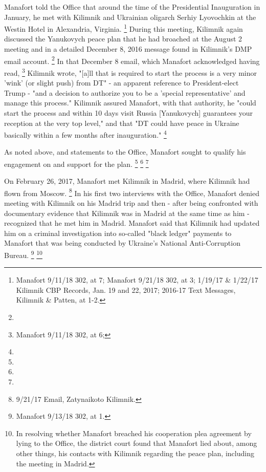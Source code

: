 Manafort told the Office that around the time of the Presidential Inauguration in January, he met with Kilimnik and Ukrainian oligarch Serhiy Lyovochkin at the Westin Hotel in Alexandria, Virginia.%
\footnote{ Manafort 9/11/18 302, at 7;
Manafort 9/21/18 302, at 3;
1/19/17 \& 1/22/17 Kilimnik CBP Records, Jan. 19 and 22, 2017;
2016-17 Text Messages, Kilimnik \& Patten, at 1-2.}
During this meeting, Kilimnik again discussed the Yanukovych peace plan that he had broached at the August 2 meeting and in a detailed December 8, 2016 message found in Kilimnik's DMP email account.%
\footnote{}
In that December 8 email, which Manafort acknowledged having read,%
\footnote{Manafort 9/11/18 302, at 6;
}
Kilimnik wrote, "[a]ll that is required to start the process is a very minor 'wink' (or slight push) from DT" - an apparent reference to President-elect Trump - "and a decision to authorize you to be a 'special representative' and manage this process."
Kilimnik assured Manafort, with that authority, he "could start the process and within 10 days visit Russia [Yanukovych] guarantees your reception at the very top level," and that "DT could have peace in Ukraine basically within a few months after inauguration."%
\footnote{}

As noted above,
and statements to the Office, Manafort sought to qualify his engagement on and support for the plan.
\footnote{}
\footnote{}
\footnote{}

On February 26, 2017, Manafort met Kilimnik in Madrid, where Kilimnik had flown from Moscow.%
\footnote{9/21/17 Email, Zatynaikoto Kilimnik.}
In his first two interviews with the Office, Manafort denied meeting with Kilimnik on his Madrid trip and then - after being confronted with documentary evidence that Kilimnik was in Madrid at the same time as him - recognized that he met him in Madrid.
Manafort said that Kilimnik had updated him on a criminal investigation into so-called "black ledger" payments to Manafort that was being conducted by Ukraine's National Anti-Corruption Bureau.%
\footnote{Manafort 9/13/18 302, at 1.}
\footnote{ In resolving whether Manafort breached his cooperation plea agreement by lying to the Office, the district court found that Manafort lied about, among other things, his contacts with Kilimnik regarding the peace plan, including the meeting in Madrid.}

